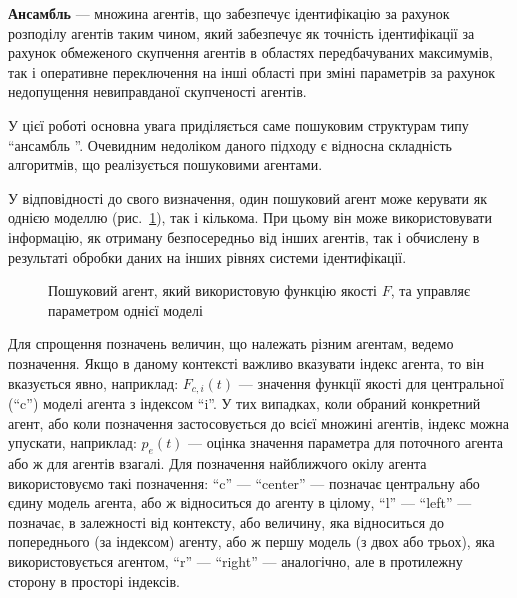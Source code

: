 \documentclass[a4paper,13pt]{atuaref}
\begin{document}
\textbf {Ансамбль} ---
множина агентів, що забезпечує ідентифікацію за рахунок розподілу агентів таким
чином, який забезпечує як точність ідентифікації за рахунок обмеженого
скупчення агентів в областях передбачуваних максимумів, так і оперативне
переключення на інші області при зміні параметрів за рахунок недопущення
невиправданої скупченості агентів.

У цієї роботі основна увага приділяється саме пошуковим структурам типу
``ансамбль ''. Очевидним недоліком даного підходу є відносна складність
алгоритмів, що реалізується пошуковими агентами.

У відповідності до свого визначення, один пошуковий агент може керувати як
однією моделлю (рис.~\ref{atu:f:agent1}), так і кількома. При цьому він
може використовувати інформацію, як отриману безпосередньо від інших агентів,
так і обчислену в результаті обробки даних на інших рівнях системи
ідентифікації.

\begin{figure}[htb!]
\begin{center}

\end{center}
\caption{Пошуковий агент, який використовую функцію якості $F$, та управляє параметром однієї моделі}
\label{atu:f:agent1}
\end{figure}

Для спрощення позначень величин, що належать різним агентам, ведемо
позначення. Якщо в даному контексті важливо вказувати індекс агента, то він
вказується явно, наприклад: $ F_{c, i} (t) $ --- значення функції якості для
центральної (``c'') моделі агента з індексом ``i''. У тих випадках, коли
обраний конкретний агент, або коли позначення застосовується до всієї множині
агентів, індекс можна упускати, наприклад: $ p_e (t) $
--- оцінка значення параметра для поточного агента або ж для агентів взагалі.
Для позначення найближчого окілу агента використовуємо такі позначення:
``c'' --- ``center'' --- позначає центральну або єдину модель агента, або ж
відноситься до агенту в цілому, ``l'' --- ``left'' --- позначає, в
залежності від контексту, або величину, яка відноситься до попереднього (за
індексом) агенту, або ж першу модель (з двох або трьох), яка використовується
агентом, ``r'' --- ``right'' --- аналогічно, але в протилежну сторону в
просторі індексів.
\end{document}
